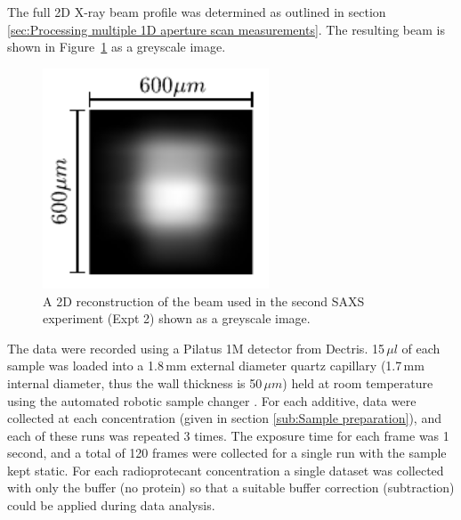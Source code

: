 The full 2D X-ray beam profile was determined as outlined in section \ref{sec:Processing multiple 1D aperture scan measurements}. The resulting beam is shown in Figure~\ref{fig:SAXS beam profile} as a greyscale image.
\begin{figure}
    \centering
    \includegraphics[width=0.6\textwidth]{figures/saxs/SAXS_beam.pdf}
    \caption[A 2D reconstruction of beam used in the second SAXS experiment]{A 2D reconstruction of the beam used in the second SAXS experiment (Expt 2) shown as a greyscale image.}
    \label{fig:SAXS beam profile}
\end{figure}

The data were recorded using a Pilatus 1M detector from Dectris.
15\,$\mu l$ of each sample was loaded into a 1.8$\,$mm external diameter quartz capillary (1.7\,mm internal diameter, thus the wall thickness is 50\,$\mu m$) held at room temperature using the automated robotic sample changer \cite{round2015biosaxs}.
For each additive, data were collected at each concentration (given in section \ref{sub:Sample preparation}), and each of these runs was repeated 3 times.
The exposure time for each frame was 1 second, and a total of 120 frames were collected for a single run with the sample kept static.
For each radioprotecant concentration a single dataset was collected with only the buffer (no protein) so that a suitable buffer correction (subtraction) could be applied during data analysis.

